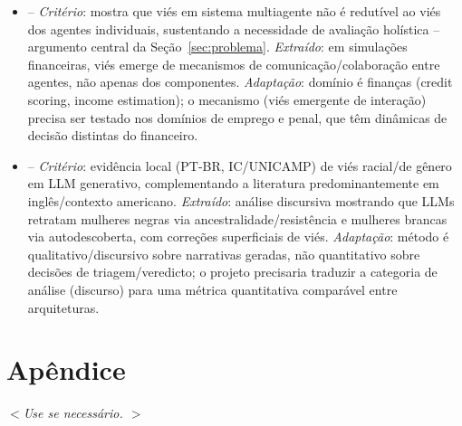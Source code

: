 \documentclass[12pt]{article}
\begin{document}
\begin{itemize}
    \item \textbf{\citet{madigan2025emergent}} -- \textit{Critério}: mostra que viés em sistema multiagente não é redutível ao viés dos agentes individuais, sustentando a necessidade de avaliação holística -- argumento central da Seção~\ref{sec:problema}. \textit{Extraído}: em simulações financeiras, viés emerge de mecanismos de comunicação/colaboração entre agentes, não apenas dos componentes. \textit{Adaptação}: domínio é finanças (credit scoring, income estimation); o mecanismo (viés emergente de interação) precisa ser testado nos domínios de emprego e penal, que têm dinâmicas de decisão distintas do financeiro.

    \item \textbf{\citet{bonil2025yet}} -- \textit{Critério}: evidência local (PT-BR, IC/UNICAMP) de viés racial/de gênero em LLM generativo, complementando a literatura predominantemente em inglês/contexto americano. \textit{Extraído}: análise discursiva mostrando que LLMs retratam mulheres negras via ancestralidade/resistência e mulheres brancas via autodescoberta, com correções superficiais de viés. \textit{Adaptação}: método é qualitativo/discursivo sobre narrativas geradas, não quantitativo sobre decisões de triagem/veredicto; o projeto precisaria traduzir a categoria de análise (discurso) para uma métrica quantitativa comparável entre arquiteturas.
\end{itemize}

\section*{Apêndice}
\label{sec:apendice}

\textit{$<$Use se necessário. $>$}



\newpage
{}
\end{document}
